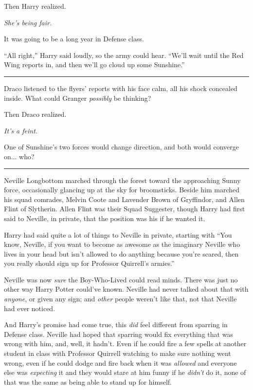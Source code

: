 Then Harry realized.

\emph{She's being fair.}

It was going to be a long year in Defense class.

``All right,'' Harry said loudly, so the army could hear. ``We'll wait
until the Red Wing reports in, and then we'll go cloud up some
Sunshine.''

\begin{center}\rule{3in}{0.4pt}\end{center}

Draco listened to the flyers' reports with his face calm, all his shock
concealed inside. What could Granger \emph{possibly} be thinking?

Then Draco realized.

\emph{It's a feint.}

One of Sunshine's two forces would change direction, and both would
converge on... who?

\begin{center}\rule{3in}{0.4pt}\end{center}

Neville Longbottom marched through the forest toward the approaching
Sunny force, occasionally glancing up at the sky for broomsticks. Beside
him marched his squad comrades, Melvin Coote and Lavender Brown of
Gryffindor, and Allen Flint of Slytherin. Allen Flint was their Squad
Suggester, though Harry had first said to Neville, in private, that the
position was his if he wanted it.

Harry had said quite a lot of things to Neville in private, starting
with ``You know, Neville, if you want to become as awesome as the
imaginary Neville who lives in your head but isn't allowed to do
anything because you're scared, then you really should sign up for
Professor Quirrell's armies.''

Neville was now \emph{sure} the Boy-Who-Lived could read minds. There
was just no other way Harry Potter could've known. Neville had never
talked about that with \emph{anyone}, or given any sign; and
\emph{other} people weren't like that, not that Neville had ever
noticed.

And Harry's promise had come true, this \emph{did} feel different from
sparring in Defense class. Neville had hoped that sparring would fix
everything that was wrong with him, and, well, it hadn't. Even if he
could fire a few spells at another student in class with Professor
Quirrell watching to make sure nothing went wrong, even if he could
dodge and fire back when it was \emph{allowed} and everyone else was
\emph{expecting} it and they would stare at him funny if he
\emph{didn't} do it, none of that was the same as being able to stand up
for himself.

